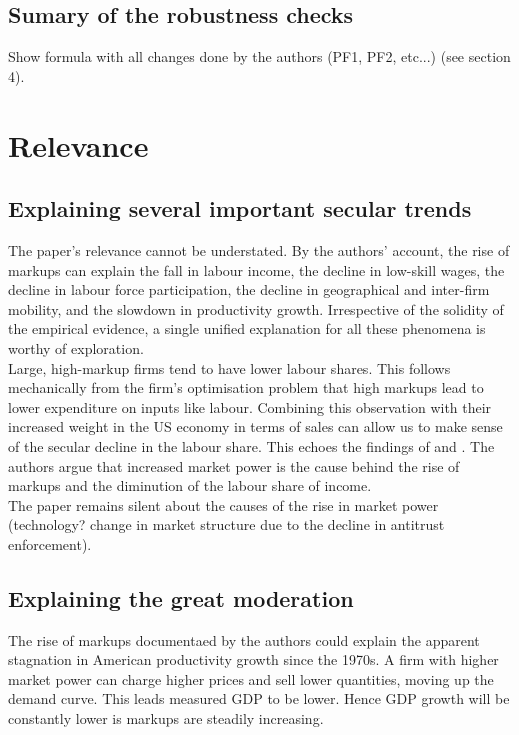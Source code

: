 \documentclass{amsart}
\theoremstyle{definition}
\theoremstyle{remark}
\numberwithin{equation}{section}
\begin{document}
\subsection*{Sumary of the robustness checks} Show formula with all changes done by the authors (PF1, PF2, etc...) (see section 4).

\section{Relevance}

\subsection*{Explaining several important secular trends} The paper's relevance cannot be understated. By the authors' account, the rise of markups can explain the fall in labour income, the decline in low-skill wages, the decline in labour force participation, the decline in geographical and inter-firm mobility, and the slowdown in productivity growth. Irrespective of the solidity of the empirical evidence, a single unified explanation for all these phenomena is worthy of exploration. \\

Large, high-markup firms tend to have lower labour shares. This follows mechanically from the firm's optimisation problem that high markups lead to lower expenditure on inputs like labour. Combining this observation with their increased weight in the US economy in terms of sales can allow us to make sense of the secular decline in the labour share. This echoes the findings of \cite{autor2019fall} and \cite{kehrig2017growing}. The authors argue that increased market power is the cause behind the rise of markups and the diminution of the labour share of income.\\

The paper remains silent about the causes of the rise in market power (technology? change in market structure due to the decline in antitrust enforcement).

\subsection*{Explaining the great moderation} The rise of markups documentaed by the authors could explain the apparent stagnation in American productivity growth since the 1970s. A firm with higher market power can charge higher prices and sell lower quantities, moving up the demand curve. This leads measured GDP to be lower. Hence GDP growth will be constantly lower is markups are steadily increasing.\\
\end{document}
